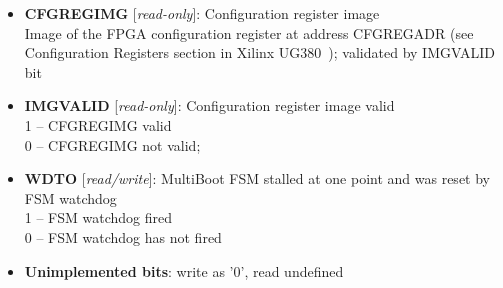 \vspace{11pt}
\noindent
{}

\begin{itemize}
\item \begin{small}
{\bf 
CFGREGIMG
} [\emph{read-only}]: Configuration register image
\\
Image of the FPGA configuration register at address CFGREGADR (see Configuration Registers section in Xilinx UG380~\cite{ug380}); validated by IMGVALID bit
\end{small}
\item \begin{small}
{\bf 
IMGVALID
} [\emph{read-only}]: Configuration register image valid
\\
1 -- CFGREGIMG valid \\      0 -- CFGREGIMG not valid;
\end{small}
\item \begin{small}
{\bf 
WDTO
} [\emph{read/write}]: MultiBoot FSM stalled at one point and was reset by FSM watchdog
\\
1 -- FSM watchdog fired \\      0 -- FSM watchdog has not fired
\end{small}
\item \begin{small}
\textbf{Unimplemented bits}: write as '0', read undefined
\end{small}
\end{itemize}
\vspace{11pt}

